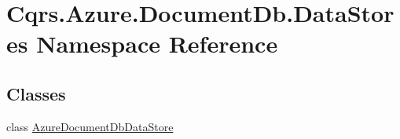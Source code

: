 \hypertarget{namespaceCqrs_1_1Azure_1_1DocumentDb_1_1DataStores}{}\section{Cqrs.\+Azure.\+Document\+Db.\+Data\+Stores Namespace Reference}
\label{namespaceCqrs_1_1Azure_1_1DocumentDb_1_1DataStores}
\subsection*{Classes}
\begin{DoxyCompactItemize}
\item 
class \hyperlink{classCqrs_1_1Azure_1_1DocumentDb_1_1DataStores_1_1AzureDocumentDbDataStore}{Azure\+Document\+Db\+Data\+Store}
\end{DoxyCompactItemize}
